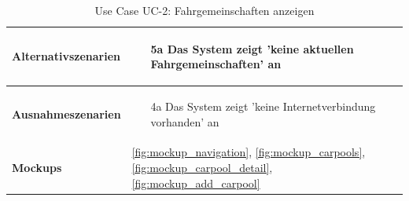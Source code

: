 \begin{table}[ht]
\begin{tabular}{ l | p{10cm} }
	\textbf{Alternativszenarien}	&	\begin{enumerate}
					\item[5a] Das System zeigt 'keine aktuellen Fahrgemeinschaften' an
					\end{enumerate}
					\\ \hline
	\textbf{Ausnahmeszenarien}&	\begin{enumerate}
					\item[4a] Das System zeigt 'keine Internetverbindung vorhanden' an
					\end{enumerate}
					\\ \hline
	\textbf{Mockups}	 	&	\ref{fig:mockup_navigation}, \ref{fig:mockup_carpools}, \ref{fig:mockup_carpool_detail},
					\ref{fig:mockup_add_carpool}
  \end{tabular}
   \caption{Use Case UC-2: Fahrgemeinschaften anzeigen}\label{table:use_case_2}
\end{table}


